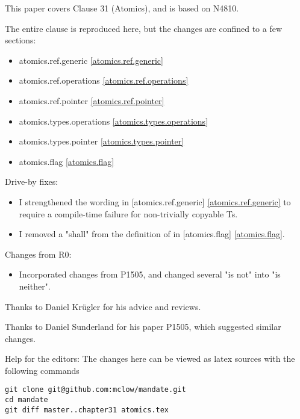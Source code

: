 This paper covers Clause 31 (Atomics), and is based on N4810.

The entire clause is reproduced here, but the changes are confined to a few sections:

\begin{itemize}
\item{atomics.ref.generic}		\ref{atomics.ref.generic}
\item{atomics.ref.operations}	\ref{atomics.ref.operations}
\item{atomics.ref.pointer}		\ref{atomics.ref.pointer}
\item{atomics.types.operations}	\ref{atomics.types.operations}
\item{atomics.types.pointer}	\ref{atomics.types.pointer}
\item{atomics.flag}				\ref{atomics.flag}
\end{itemize}

Drive-by fixes:
\begin{itemize}
\item{I strengthened the wording in [atomics.ref.generic] \ref{atomics.ref.generic} to require a compile-time failure for non-trivially copyable Ts.}
\item{I removed a "shall" from the definition of  in [atomics.flag] \ref{atomics.flag}.}
\end{itemize}



Changes from R0:
\begin{itemize}
\item{Incorporated changes from P1505, and changed several "is not" into "is neither".}
\end{itemize}

Thanks to Daniel Krügler for his advice and reviews.

Thanks to Daniel Sunderland for his paper P1505, which suggested similar changes.

\vfill
Help for the editors: The changes here can be viewed as latex sources with the following commands
\begin{verbatim}
git clone git@github.com:mclow/mandate.git
cd mandate
git diff master..chapter31 atomics.tex
\end{verbatim}
